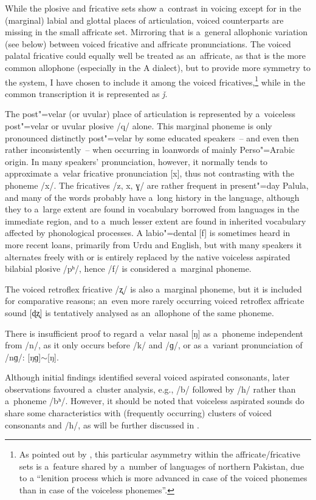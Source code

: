 While the plosive and fricative sets show a~contrast in voicing except for in the (marginal) labial and glottal places of articulation, voiced counterparts are missing in the small affricate set. Mirroring that is a~general allophonic variation (see below) between voiced fricative and affricate pronunciations. The voiced palatal fricative could equally well be treated as an~affricate, as that is the more common allophone (especially in the A dialect), but to provide more symmetry to the system, I have chosen to include it among the voiced fricatives,\footnote{As pointed out by \citet[34]{zoller2005}, this particular asymmetry within the affricate/fricative sets is a~feature shared by a~number of languages of northern Pakistan, due to a ``lenition process which is more advanced in case of the voiced phonemes than in case of the voiceless phonemes''.} while in the common transcription it is represented as \textit{ǰ}.


The post"=velar (or uvular) place of articulation is represented by a~voiceless post"=velar or uvular plosive /q/ alone. This marginal phoneme is only pronounced distinctly post"=velar by some educated speakers~-- and even then rather inconsistently~-- when occurring in loanwords of mainly Perso"=Arabic origin. In many speakers' pronunciation, however, it normally tends to approximate a~velar fricative pronunciation [x], thus not contrasting with the phoneme /x/. The fricatives /z, x, ɣ/ are rather frequent in present"=day Palula, and many of the words probably have a~long history in the language, although they to a~large extent are found in vocabulary borrowed from languages in the immediate region, and to a~much lesser extent are found in inherited vocabulary affected by phonological processes. A labio"=dental [f] is sometimes heard in more recent loans, primarily from Urdu and English, but with many speakers it alternates freely with or is entirely replaced by the native voiceless aspirated bilabial plosive /pʰ/, hence /f/ is considered a~marginal phoneme. 


The voiced retroflex fricative /ʐ/ is also a~marginal phoneme, but it is included for comparative reasons; an~even more rarely occurring voiced retroflex affricate sound [ɖʐ] is tentatively analysed as an~allophone of the same phoneme. 


There is insufficient proof to regard a~velar nasal [ŋ] as a~phoneme independent from /n/, as it only occurs before /k/ and /ɡ/, or as a~variant pronunciation of /nɡ/: [ŋɡ]$\sim$[ŋ]. 


Although initial findings identified several voiced aspirated consonants, later observations favoured a~cluster analysis, e.g., /b/ followed by /h/ rather than a~phoneme /bʰ/. However, it should be noted that voiceless aspirated sounds do share some characteristics with (frequently occurring) clusters of voiced consonants and /h/, as will be further discussed in .

